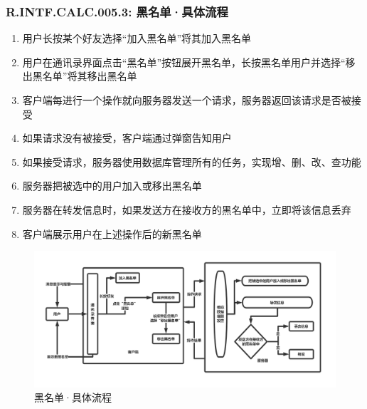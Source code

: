         \subsubsection{R.INTF.CALC.005.3: 黑名单·具体流程}
        \begin{enumerate}
            \item 用户长按某个好友选择“加入黑名单”将其加入黑名单
            \item 用户在通讯录界面点击“黑名单”按钮展开黑名单，长按黑名单用户并选择“移出黑名单”将其移出黑名单
            \item 客户端每进行一个操作就向服务器发送一个请求，服务器返回该请求是否被接受
            \item 如果请求没有被接受，客户端通过弹窗告知用户
            \item 如果接受请求，服务器使用数据库管理所有的任务，实现增、删、改、查功能
            \item 服务器把被选中的用户加入或移出黑名单
            \item 服务器在转发信息时，如果发送方在接收方的黑名单中，立即将该信息丢弃
            \item 客户端展示用户在上述操作后的新黑名单
        \end{enumerate}
        \begin{figure}[h]
            \centering
            \includegraphics[scale=0.4]{OutlineDesign/figures/黑名单·具体流程.png}
            \caption{黑名单·具体流程}
            \label{fig:server_flow}
        \end{figure}
